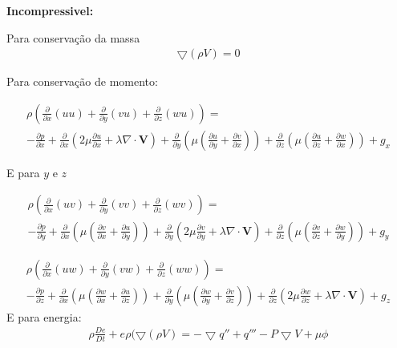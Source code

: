 \documentclass[]{article}
\begin{document}
\textbf{Incompressivel:}

Para conservação da massa
\begin{equation}
	\begin{aligned}
		\bigtriangledown (\rho V)= 0 
	\end{aligned}
\end{equation}

Para conservação de momento:

\begin{equation}
	\begin{aligned}
		 \rho(\frac{\partial}{\partial x} ( u u) + \frac{\partial}{\partial y} (v u) + \frac{\partial}{\partial z} (w u) )= \\
		- \frac{\partial p}{\partial x} + \frac{\partial}{\partial x} \left( 2 \mu \frac{\partial u}{\partial x} + \lambda \nabla \cdot \mathbf{V} \right) +
		\frac{\partial}{\partial y} \left( \mu \left( \frac{\partial u}{\partial y} + \frac{\partial v}{\partial x} \right) \right) +
		\frac{\partial}{\partial z} \left( \mu \left( \frac{\partial u}{\partial z} + \frac{\partial w}{\partial x} \right) \right) + g_x
	\end{aligned}
\end{equation}

E para $y$ e $z$

\begin{equation}
	\begin{aligned}
		 \rho(\frac{\partial}{\partial x} ( u v) + \frac{\partial}{\partial y} ( v v) + \frac{\partial}{\partial z} ( w v)) = \\
		- \frac{\partial p}{\partial y} + \frac{\partial}{\partial x} \left( \mu \left( \frac{\partial v}{\partial x} + \frac{\partial u}{\partial y} \right) \right) +
		\frac{\partial}{\partial y} \left( 2 \mu \frac{\partial v}{\partial y} + \lambda \nabla \cdot \mathbf{V} \right) +
		\frac{\partial}{\partial z} \left( \mu \left( \frac{\partial v}{\partial z} + \frac{\partial w}{\partial y} \right) \right) +  g_y
	\end{aligned}
\end{equation}

\begin{equation}
	\begin{aligned}
		\rho(\frac{\partial}{\partial x} ( u w) + \frac{\partial}{\partial y} ( v w) + \frac{\partial}{\partial z} ( w w)) = \\
		- \frac{\partial p}{\partial z} + \frac{\partial}{\partial x} \left( \mu \left( \frac{\partial w}{\partial x} + \frac{\partial u}{\partial z} \right) \right) +
		\frac{\partial}{\partial y} \left( \mu \left( \frac{\partial w}{\partial y} + \frac{\partial v}{\partial z} \right) \right) +
		\frac{\partial}{\partial z} \left( 2 \mu \frac{\partial w}{\partial z} + \lambda \nabla \cdot \mathbf{V} \right) +  g_z
	\end{aligned}
\end{equation}
E para energia:
\begin{equation}
	\begin{aligned}
		\rho \frac{ De}{Dt} + e\rho(  \bigtriangledown (\rho V) = -\bigtriangledown q'' + q''' - P\bigtriangledown V + \mu \phi
	\end{aligned}
\end{equation}
\end{document}
